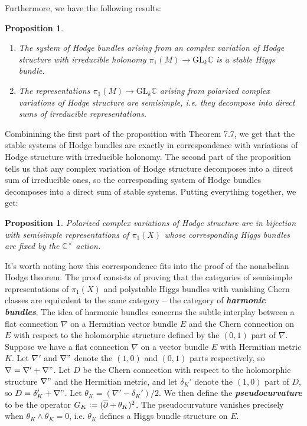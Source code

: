 \documentclass[psamsfonts, 12pt]{amsart}
\newtheorem{prop}[thm]{Proposition}
\theoremstyle{definition}
\theoremstyle{remark}
\newcommand{\ib}[1]{\textbf{\textit{#1}}}
\newcommand{\C}{\mathbb{C}}
\newcommand{\dbar}{\overline{\partial}}
\newcommand{\GL}{\mathrm{GL}}
\newcommand{\defeq}{\vcentcolon=}
\newcommand{\enumbreak}{\ \\ \vspace{-\baselineskip}}
\begin{document}
Furthermore, we have the following results:
%
\begin{prop} \enumbreak
\begin{enumerate}
  \item The system of Hodge bundles arising from an complex variation
  of Hodge structure with irreducible holonomy $\pi_1(M) \to \mathrm{GL}_k\C$
  is a stable Higgs bundle.
  \item The representations $\pi_1(M) \to \GL_k\C$ arising from polarized
  complex variations of Hodge structure are semisimple, i.e. they decompose
  into direct sums of irreducible representations.
\end{enumerate}
\end{prop}
%
Combinining the first part of the proposition with Theorem 7.7, we get
that the stable systems of Hodge bundles are exactly in correspondence
with variations of Hodge structure with irreducible holonomy. The
second part of the proposition tells us that any complex variation
of Hodge structure decomposes into a direct sum of irreducible ones,
so the corresponding system of Hodge bundles decomposes into
a direct sum of stable systems. Putting everything together, we
get:
%
\begin{prop}
Polarized complex variations of Hodge structure are in bijection with
semisimple representations of $\pi_1(X)$ whose corresponding Higgs bundles
are fixed by the $\C^\times$ action.
\end{prop}
%
It's worth noting how this correspondence fits into the proof of
the nonabelian Hodge theorem. The proof consists of proving that
the categories of semisimple representations of $\pi_1(X)$ and
polystable Higgs bundles with vanishing Chern classes are equivalent
to the same category -- the category of \ib{harmonic bundles}.
The idea of harmonic bundles concerns the subtle interplay
between a flat connection $\nabla$ on a Hermitian vector bundle $E$
and the Chern connection on $E$ with respect to the holomorphic
structure defined by the $(0,1)$ part of $\nabla$. \\

Suppose we have a flat connection $\nabla$ on a vector bundle $E$ with Hermitian
metric $K$. Let $\nabla'$ and $\nabla"$ denote the $(1,0)$ and $(0,1)$ parts
respectively, so $\nabla = \nabla' + \nabla"$. Let $D$ be the Chern connection with
respect to the holomorphic structure $\nabla"$ and the Hermitian metric,
and let $\delta_K'$ denote the $(1,0)$ part of $D$, so $D = \delta_K' + \nabla"$.
Let $\theta_K = (\nabla' - \delta_K')/2$. We then define the \ib{pseudocurvature}
to be the operator $G_K \defeq (\dbar + \theta_K)^2$. The pseudocurvature vanishes
precisely when $\theta_K\wedge\theta_K = 0$, i.e. $\theta_K$ defines a Higgs bundle
structure on $E$.\\
\end{document}
